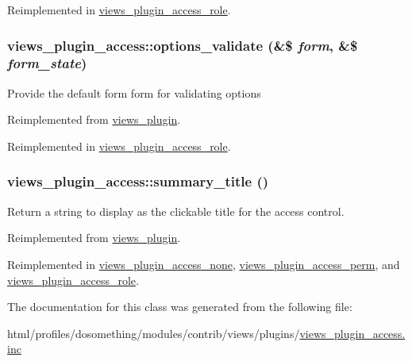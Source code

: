 Reimplemented in \hyperlink{classviews__plugin__access__role_ad9bf6eddd91a7c224fb813a58077ee4d}{views\_\-plugin\_\-access\_\-role}.\hypertarget{classviews__plugin__access_a1ac0bea409be6ef8d7eb4bfafcf760c6}{
\subsubsection[{options\_\-validate}]{\setlength{\rightskip}{0pt plus 5cm}views\_\-plugin\_\-access::options\_\-validate (\&\$ {\em form}, \/  \&\$ {\em form\_\-state})}}
\label{classviews__plugin__access_a1ac0bea409be6ef8d7eb4bfafcf760c6}
Provide the default form form for validating options 

Reimplemented from \hyperlink{classviews__plugin_a46d72eb35feea36fed83cd1355a47431}{views\_\-plugin}.

Reimplemented in \hyperlink{classviews__plugin__access__role_a82fda91cd55acbbcac1759448c8fc471}{views\_\-plugin\_\-access\_\-role}.\hypertarget{classviews__plugin__access_ade500a95e599deffa417f8cbdd67bbf4}{
\subsubsection[{summary\_\-title}]{\setlength{\rightskip}{0pt plus 5cm}views\_\-plugin\_\-access::summary\_\-title ()}}
\label{classviews__plugin__access_ade500a95e599deffa417f8cbdd67bbf4}
Return a string to display as the clickable title for the access control. 

Reimplemented from \hyperlink{classviews__plugin_a9a4aaece48a7cf465dd95d59a3bc5ea1}{views\_\-plugin}.

Reimplemented in \hyperlink{classviews__plugin__access__none_ab76847f19e943e463cbc2ff1723bdb00}{views\_\-plugin\_\-access\_\-none}, \hyperlink{classviews__plugin__access__perm_a1e0e33b03ffddf2b98c60740222d8ca5}{views\_\-plugin\_\-access\_\-perm}, and \hyperlink{classviews__plugin__access__role_a25dbbc0f06093f0e4ee13182ea0d277f}{views\_\-plugin\_\-access\_\-role}.

The documentation for this class was generated from the following file:\begin{DoxyCompactItemize}
\item 
html/profiles/dosomething/modules/contrib/views/plugins/\hyperlink{views__plugin__access_8inc}{views\_\-plugin\_\-access.inc}\end{DoxyCompactItemize}
